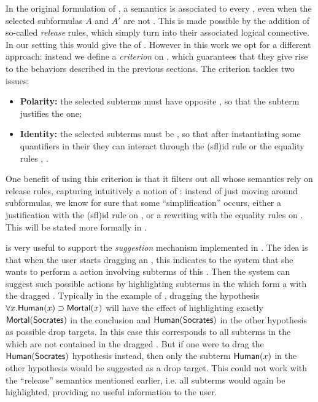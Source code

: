 \begin{scope}
In the original formulation of  , a
semantics is associated to every , even when the selected
subformulas $A$ and $A'$ are not . This is made possible by the
addition of so-called \emph{release} rules, which simply turn  into their
associated logical connective. In our setting this would give the 
of . However in this work we opt for a different approach:
instead we define a \emph{ criterion} on , which guarantees that
they give rise to the behaviors described in the previous sections. The
criterion tackles two issues:
\begin{itemize}
  \item \textbf{Polarity:} the selected subterms must have opposite
  \emph{}, so that the \emph{} subterm justifies the
  \emph{} one;
  \item \textbf{Identity:} the selected subterms must be \emph{},
  so that after instantiating some quantifiers in their  they can
  interact through the {\kl(sfl){id}} rule or the equality rules
  {, }.
\end{itemize}
One benefit of using this criterion is that it filters out all 
whose semantics rely on release rules, capturing intuitively a notion of
: instead of just moving around subformulas, we know for
sure that some ``simplification'' occurs, either a justification with the
{\kl(sfl){id}} rule on , or a rewriting with the equality
rules on . This will be stated more formally in
.

 is very useful to support the \emph{suggestion} mechanism
implemented in . The idea is that when the user starts dragging an
, this indicates to the system that she wants to perform a 
action involving subterms of this . Then the system can suggest such
possible actions by highlighting subterms in the  which form a
  with the dragged . Typically in the example of
, dragging the hypothesis $\forall x. \mbox{\textsf{Human}}(x) \supset
\mbox{\textsf{Mortal}}(x)$ will have the effect of highlighting exactly $\mbox{\textsf{Mortal}}(\mbox{\textsf{Socrates}})$ in
the conclusion and $\mbox{\textsf{Human}}(\mbox{\textsf{Socrates}})$ in the other hypothesis as possible drop
targets. In this case this corresponds to all subterms in the  which
are not contained in the dragged . But if one were to drag the
$\mbox{\textsf{Human}}(\mbox{\textsf{Socrates}})$ hypothesis instead, then only the subterm $\mbox{\textsf{Human}}(x)$ in the
other hypothesis would be suggested as a drop target. This could not work with
the ``release'' semantics mentioned earlier, i.e. all subterms would again be
highlighted, providing no useful information to the user.


\end{scope}
